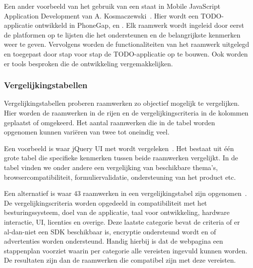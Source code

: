 Een ander voorbeeld van het gebruik van een  staat in Mobile JavaScript Application Development van A. Kosmaczewski~\cite{Kosmaczewski2012}.
Hier wordt een TODO-applicatie ontwikkeld in PhoneGap, \st{} en \jqm{}.
Elk raamwerk wordt ingeleid door eerst de platformen op te lijsten die het ondersteunen en de belangrijkste kenmerken weer te geven.
Vervolgens worden de functionaliteiten van het raamwerk uitgelegd en toegepast door stap voor stap de TODO-applicatie op te bouwen.
Ook worden er tools besproken die de ontwikkeling vergemakkelijken.

\subsubsection{Vergelijkingstabellen}
\label{sec:manier-vergelijkingstabellen}
Vergelijkingstabellen proberen raamwerken zo objectief mogelijk te vergelijken.
Hier worden de raamwerken in de rijen en de vergelijkingscriteria in de kolommen geplaatst of omgekeerd.
Het aantal raamwerken die in de tabel worden opgenomen kunnen variëren van twee tot oneindig veel.

Een voorbeeld is  waar jQuery UI met \kendo{} wordt vergeleken~\cite{Bristowe2012}.
Het bestaat uit één grote tabel die specifieke kenmerken tussen beide raamwerken vergelijkt.
In de tabel vinden we onder andere een vergelijking van beschikbare thema's,  browsercompatibiliteit,  formuliervalidatie,  ondersteuning van het product etc.

Een alternatief is  waar 43 raamwerken in een vergelijkingstabel zijn opgenomen~\cite{Falk2011}. 
De vergelijkingscriteria worden opgedeeld in compatibiliteit met het besturingssysteem,  doel van de applicatie,  taal voor ontwikkeling,  hardware interactie,  UI,  licenties en overige.  
Deze laatste categorie bevat de criteria of er al-dan-niet een SDK beschikbaar is, encryptie ondersteund wordt en of advertenties worden ondersteund.  
Handig hierbij is dat de webpagina een stappenplan voorziet waarin per categorie alle vereisten ingevuld kunnen worden.  
De resultaten zijn dan de raamwerken die compatibel zijn met deze vereisten.

